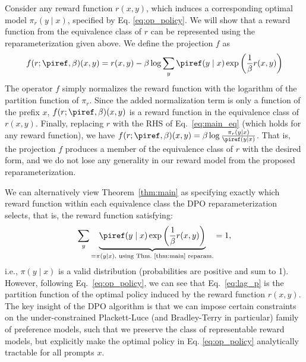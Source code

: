 \begin{sproof}
    Consider any reward function $r(x, y)$, which induces a corresponding optimal model $\pi_r(y \mid x)$, specified by Eq. \ref{eq:op_policy}. We will show that a reward function from the equivalence class of $r$ can be represented using the reparameterization given above. We define the projection $f$ as  
\begin{equation}
    f(r; \piref, \beta)(x, y) = r(x, y) - \beta\log\sum_{y}\piref(y\mid x)\exp\left(\frac{1}{\beta}r(x, y)\right)
\end{equation}
The operator $f$ simply normalizes the reward function with the logarithm of the partition function of $\pi_r$. Since the added normalization term is only a function of the prefix $x$, $f(r; \piref, \beta)(x, y) $ is a reward function in the equivalence class of $r(x, y)$. Finally, replacing $r$ with the RHS of Eq.~\ref{eq:main_eq} (which holds for any reward function), we have $f(r; \piref, \beta)(x, y) = \beta \log \frac{\pi_r(y\mid x)}{\piref(y\mid x)}$. That is, the projection $f$ produces a member of the equivalence class of $r$ with the desired form, and we do not lose any generality in our reward model from the proposed reparameterization.
\end{sproof}
We can alternatively view Theorem~\ref{thm:main} as specifying exactly which reward function within each equivalence class the DPO reparameterization selects, that is, the reward function satisfying:
\begin{equation}\label{eq:lag_p}
     \sum_{y}\underbrace{\piref(y\mid x)\exp\left(\frac{1}{\beta}r(x, y)\right)}_{=\pi(y\mid x)\text{, using Thm.~\ref{thm:main} reparam.}} = 1,
\end{equation}
i.e., $\pi(y\mid x)$ is a valid distribution (probabilities are positive and sum to 1).
However, following Eq.~\ref{eq:op_policy}, we can see that Eq.~\ref{eq:lag_p} is the partition function of the optimal policy induced by the reward function $r(x, y)$.
The key insight of the DPO algorithm is that we can impose certain constraints on the under-constrained Plackett-Luce (and Bradley-Terry in particular) family of preference models, such that we preserve the class of representable reward models, but explicitly make the optimal policy in Eq. \ref{eq:op_policy} analytically tractable for all prompts $x$.

